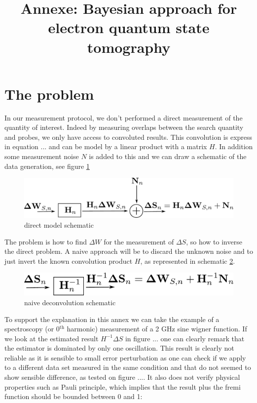 \documentclass[english]{article}
\begin{document}
\title{Annexe: Bayesian approach for electron quantum state tomography}

\maketitle

\section{The problem \label{The problem}}


In our measurement protocol, we don't performed a direct measurement of the quantity of interest. Indeed by measuring overlaps between the search quantity and probes, we only have access to convoluted results. This convolution is express in equation ... and can be model by a linear product with a matrix $H$. In addition some measurement noise $N$ is added to this and we can draw a schematic of the data generation, see figure \ref{fig: direct model}

\begin{figure}[H]
\centering
\includegraphics[scale = 0.5]{direct_model}
\caption{direct model schematic}
\label{fig: direct model}
\end{figure}

The problem is how to find $\Delta W$ for the measurement of $\Delta S$, so how to inverse the direct problem. A naive approach will be to discard the unknown noise and to just invert the known convolution product $H$, as represented in schematic \ref{fig: naive deconvolution}.

\begin{figure}[H]
\centering
\includegraphics[scale = 0.5]{naive_deconvolution}
\caption{naive deconvolution schematic}
\label{fig: naive deconvolution}
\end{figure}

To support the explanation in this annex we can take the example of a spectroscopy (or 0$^{\mathrm{th}}$ harmonic) measurement of a 2 GHz sine wigner function. If we look at the estimated result $H^{-1}\Delta S$ in figure ... one can clearly remark that the estimator is dominated by only one oscillation. This result is clearly not reliable as it is sensible to small error perturbation as one can check if we apply to a different data set measured in the same condition and that do not seemed to show sensible difference, as tested on figure .... It also does not verify physical properties such as Pauli principle, which implies that the result plus the fremi function should be bounded between 0 and 1:
\end{document}
